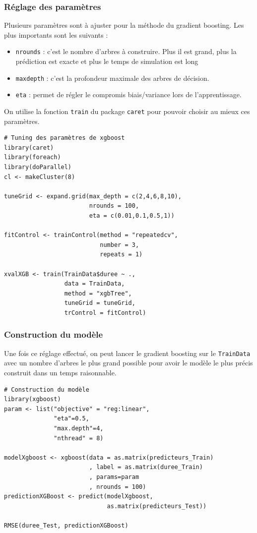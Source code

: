 \documentclass[a4paper,11pt]{article}
\begin{document}
\subsubsection{Réglage des paramètres}
Plusieurs paramètres sont à ajuster pour la méthode du gradient boosting. Les plus importants sont les suivants : 
\begin{itemize}
\item \texttt{nrounds} : c'est le nombre d'arbres à construire. Plus il est grand, plus la prédiction est exacte et plus le temps de simulation est long
\item \texttt{maxdepth} : c'est la profondeur maximale des arbres de décision.
\item \texttt{eta} : permet de régler le compromis biais/variance lors de l'apprentissage.
\end{itemize}
On utilise la fonction \texttt{train} du package \texttt{caret} pour pouvoir choisir au mieux ces paramètres.
\begin{lstlisting}
# Tuning des paramètres de xgboost
library(caret)
library(foreach)
library(doParallel)
cl <- makeCluster(8)

tuneGrid <- expand.grid(max_depth = c(2,4,6,8,10),
                        nrounds = 100,
                        eta = c(0.01,0.1,0.5,1))

fitControl <- trainControl(method = "repeatedcv",
                           number = 3,
                           repeats = 1)

xvalXGB <- train(TrainData$duree ~ .,
                 data = TrainData,
                 method = "xgbTree",
                 tuneGrid = tuneGrid,
                 trControl = fitControl)
\end{lstlisting}
\subsubsection{Construction du modèle}
Une fois ce réglage effectué, on peut lancer le gradient boosting sur le \texttt{TrainData} avec un nombre d'arbres le plus grand possible pour avoir le modèle le plus précis construit dans un temps raisonnable.
\begin{lstlisting}
# Construction du modèle
library(xgboost)
param <- list("objective" = "reg:linear",
              "eta"=0.5,
              "max.depth"=4,
              "nthread" = 8)

modelXgboost <- xgboost(data = as.matrix(predicteurs_Train)
                        , label = as.matrix(duree_Train)
                        , params=param
                        , nrounds = 100)
predictionXGBoost <- predict(modelXgboost,
                             as.matrix(predicteurs_Test))

RMSE(duree_Test, predictionXGBoost)
\end{lstlisting}
\end{document}
